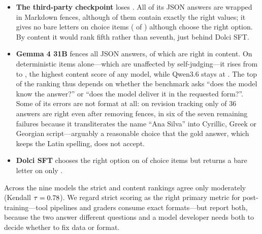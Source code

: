 \documentclass[11pt]{article}
\begin{document}
\begin{itemize}
\item \textbf{The third-party checkpoint} loses \formatTaxNicher{}. All \jsonFencedNicher{} of its JSON answers are wrapped in Markdown fences, although \jsonFencedCorrectNicher{} of them contain exactly the right values; it gives no bare letters on choice items (\choiceStrictNicher{} of \nChoice{}) although \choiceSemanticNicher{} choose the right option. By content it would rank fifth rather than seventh, just behind Dolci SFT.
\item \textbf{Gemma 4 31B} fences all \jsonFencedGemmalarge{} JSON answers, \jsonFencedCorrectGemmalarge{} of which are right in content. On deterministic items alone---which are unaffected by self-judging---it rises from \detStrictGemmalarge{} to \detLenientGemmalarge{}, the highest content score of any model, while Qwen3.6 stays at \detStrictQwen. The top of the ranking thus depends on whether the benchmark asks ``does the model know the answer?'' or ``does the model deliver it in the requested form?''. Some of its errors are not format at all: on revision tracking only \gemmaRevContentOk{} of 36 answers are right even after removing fences, in six of the seven remaining failures because it transliterates the name ``Ana Silva'' into Cyrillic, Greek or Georgian script---arguably a reasonable choice that the gold answer, which keeps the Latin spelling, does not accept.
\item \textbf{Dolci SFT} chooses the right option on \choiceSemanticDolci{} of \nChoice{} choice items but returns a bare letter on only \choiceStrictDolci{}.
\end{itemize}
Across the nine models the strict and content rankings agree only moderately (Kendall $\tau=0.78$). We regard strict scoring as the right primary metric for post-training---tool pipelines and graders consume exact formats---but report both, because the two answer different questions and a model developer needs both to decide whether to fix data or format.

\begin{table}[htbp]
\centering
\small
\caption{Strict versus content-only scores. Content-only removes output contracts from deterministic items (judged items unchanged). Format gap = content $-$ strict over all items. Ranks over all nine runs.}
\label{tab:format}
\resizebox{\linewidth}{!}{}
\end{table}
\end{document}
